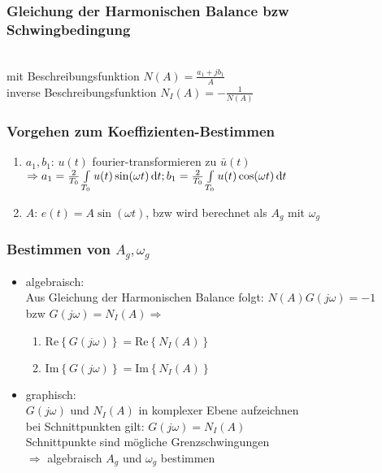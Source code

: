 \documentclass[6pt,a4paper,fleqn]{scrartcl}
\newcommand*\diff{\mathop{}\!\mathrm{d}}
\begin{document}
\begin{multicols*}{4}
\subsubsection*{Gleichung der Harmonischen Balance bzw Schwingbedingung}
 \\
mit Beschreibungsfunktion $N(A) = \frac{a_1 + j b_1}{A}$ \\
inverse Beschreibungsfunktion $N_I(A) = - \frac{1}{N(A)}$ \\

\subsubsection*{Vorgehen zum Koeffizienten-Bestimmen}

\begin{enumerate}
  \item $a_1, b_1$:  $u(t)$ fourier-transformieren zu $\bar{u}(t)$ \\
    $\Rightarrow a_1 = \frac{2}{T_0} \int\limits_{T_0} u(t) \sin(\omega t) \diff t; \\
                 b_1 = \frac{2}{T_0} \int\limits_{T_0} u(t) \cos(\omega t) \diff t$
  \item $A$: $e(t) = A \sin(\omega t)$, bzw wird berechnet als $A_g$ mit $\omega_g$
\end{enumerate}

\subsubsection*{Bestimmen von $A_g, \omega_g$}
\begin{itemize}
  \item algebraisch: \\
    Aus Gleichung der Harmonischen Balance folgt: $N(A)G(j\omega) = -1$ \\
    bzw $G(j \omega) = N_I(A) \Rightarrow$ \\
    \begin{enumerate}
      \item $\text{Re}\left\{ G(j \omega) \right\} = \text{Re} \left\{ N_I(A) \right\}$ \\
      \item $\text{Im}\left\{ G(j \omega) \right\} = \text{Im} \left\{ N_I(A) \right\}$
    \end{enumerate}
  \item graphisch: \\
    $G(j \omega)$ und $N_I(A)$ in komplexer Ebene aufzeichnen\\
    bei Schnittpunkten gilt: $G(j \omega) = N_I(A)$ \\
    Schnittpunkte sind mögliche Grenzschwingungen \\
    $\Rightarrow$ algebraisch $A_g$ und $\omega_g$ bestimmen
\end{itemize}


\end{multicols*}
\end{document}
